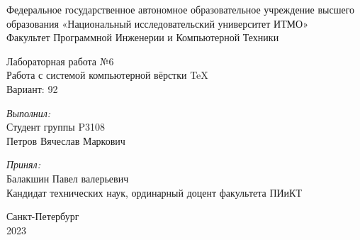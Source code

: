 
\begin{center}
\large Федеральное государственное автономное образовательное учреждение высшего образования «Национальный исследовательский университет ИТМО»\\
Факультет Программной Инженерии и Компьютерной Техники\\
\hfill 


\vspace{5.5cm}
\Large Лабораторная работа №6 \\
Работа с системой компьютерной вёрстки \TeX \\
Вариант: 92\\
\end{center}

\vspace{2.5cm}
 
\begin{flushright}
\textit{Выполнил:}\\
Студент группы P3108\\
Петров Вячеслав Маркович\

\textit{Принял:}\\
Балакшин Павел валерьевич\\
Кандидат технических наук, ординарный доцент факультета ПИиКТ\\
\end{flushright}
 
\vfill

\begin{center} Санкт-Петербург\\2023 \end{center}

\thispagestyle{empty}
\newpage
